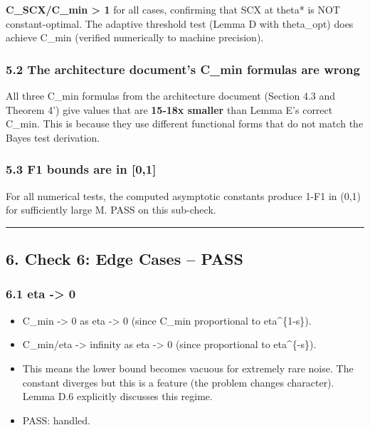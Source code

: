 \documentclass[
  12pt,
]{ctexart}
\providecommand{\tightlist}{%
  \setlength{\itemsep}{0pt}\setlength{\parskip}{0pt}}
\begin{document}
\textbf{C\_SCX/C\_min \textgreater{} 1} for all cases, confirming that
SCX at theta* is NOT constant-optimal. The adaptive threshold test
(Lemma D with theta\_opt) does achieve C\_min (verified numerically to
machine precision).

\subsubsection{5.2 The architecture document's C\_min formulas are
wrong}\label{the-architecture-documents-c_min-formulas-are-wrong}

All three C\_min formulas from the architecture document (Section 4.3
and Theorem 4') give values that are \textbf{15-18x smaller} than Lemma
E's correct C\_min. This is because they use different functional forms
that do not match the Bayes test derivation.

\subsubsection{5.3 F1 bounds are in
{[}0,1{]}}\label{f1-bounds-are-in-01}

For all numerical tests, the computed asymptotic constants produce 1-F1
in (0,1) for sufficiently large M. PASS on this sub-check.

\begin{center}\rule{0.5\linewidth}{0.5pt}\end{center}

\subsection{6. Check 6: Edge Cases --
PASS}\label{check-6-edge-cases-pass}

\subsubsection{6.1 eta -\textgreater{} 0}\label{eta---0}

\begin{itemize}
\tightlist
\item
  C\_min -\textgreater{} 0 as eta -\textgreater{} 0 (since C\_min
  proportional to eta\^{}\{1-s\}).
\item
  C\_min/eta -\textgreater{} infinity as eta -\textgreater{} 0 (since
  proportional to eta\^{}\{-s\}).
\item
  This means the lower bound becomes vacuous for extremely rare noise.
  The constant diverges but this is a feature (the problem changes
  character). Lemma D.6 explicitly discusses this regime.
\item
  PASS: handled.
\end{itemize}
\end{document}

